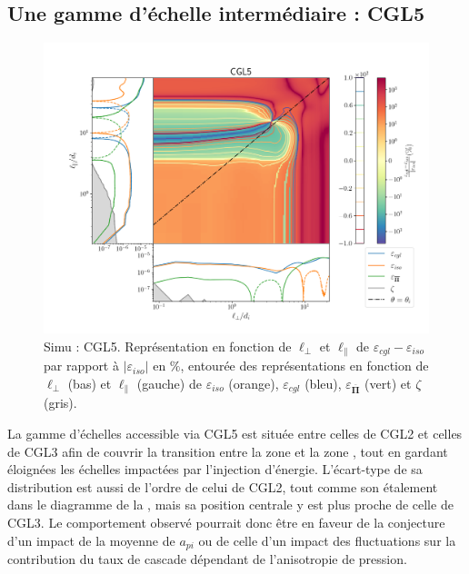 \subsection{Une gamme d'échelle intermédiaire : CGL5}
\begin{figure}[!ht]
 \centering
 \includegraphics[width=0.95\linewidth,trim=1cm 1cm 0cm 2cm, clip=true]{./Mainmatter/Part_3/images_ch3/CGL5_panel_isocgl_percent}
 \cprotect\caption{Simu : CGL5. Représentation  en fonction de \ensuremath{\ell_{\perp}} et \ensuremath{\ell_{\parallel}} de \ensuremath{\varepsilon_{cgl}-\varepsilon_{iso}} par rapport à \ensuremath{|\varepsilon_{iso}|} en \ensuremath{\%}, entourée des représentations  en fonction de \ensuremath{\ell_{\perp}} (bas) et \ensuremath{\ell_{\parallel}} (gauche) de \ensuremath{\varepsilon_{iso}} (orange), \ensuremath{\varepsilon_{cgl}} (bleu), \ensuremath{\varepsilon_{\overline{\boldsymbol{\Pi}}}} (vert) et \ensuremath{\zeta} (gris). }
\label{fig:trip_CGL5}
\end{figure}

 La gamme d'échelles accessible via CGL5 est située entre celles de CGL2 et celles de CGL3 afin de couvrir la transition entre la zone  et la zone , tout en gardant éloignées les échelles impactées par l'injection d'énergie. %
 L'écart-type de sa distribution est aussi de l'ordre de celui de CGL2, tout comme son étalement dans le diagramme de la , mais sa position centrale y est plus proche de celle de CGL3. Le comportement observé pourrait donc être en faveur de la conjecture d'un impact de la moyenne de $a_{pi}$ ou de celle d'un impact des fluctuations sur la contribution du taux de cascade dépendant de l'anisotropie de pression. 
 

